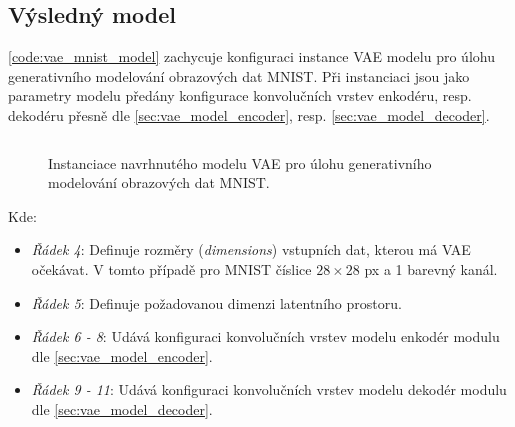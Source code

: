 \subsection{Výsledný model}
\label{sec:vae_prepared_model}
\autoref{code:vae_mnist_model} zachycuje konfiguraci instance VAE modelu pro úlohu generativního modelování obrazových dat MNIST.
Při instanciaci jsou jako parametry modelu předány konfigurace konvolučních vrstev enkodéru, resp. dekodéru přesně dle \autoref{sec:vae_model_encoder}, resp. \autoref{sec:vae_model_decoder}.

\begin{figure}[H]
    \inputminted[linenos]{python}{code_snippets/vae_model.py}
    \caption{Instanciace navrhnutého modelu VAE pro úlohu generativního modelování obrazových dat MNIST.}
    \label{code:vae_mnist_model}
\end{figure}

Kde:
\begin{itemize}
    \item \emph{Řádek 4}: Definuje rozměry (\emph{dimensions}) vstupních dat, kterou má VAE očekávat. V tomto případě pro MNIST číslice $28 \times 28$ px a 1 barevný kanál.
    \item \emph{Řádek 5}: Definuje požadovanou dimenzi latentního prostoru.
    \item \emph{Řádek 6 - 8}: Udává konfiguraci konvolučních vrstev modelu enkodér modulu dle \autoref{sec:vae_model_encoder}.
    \item \emph{Řádek 9 - 11}: Udává konfiguraci konvolučních vrstev modelu dekodér modulu dle \autoref{sec:vae_model_decoder}. 
\end{itemize}

